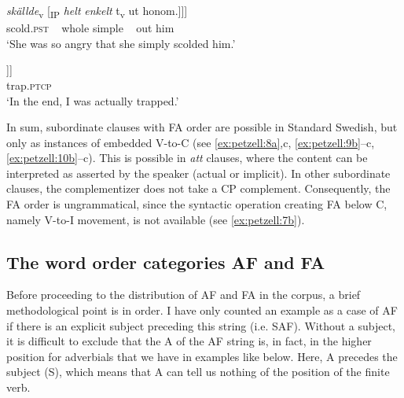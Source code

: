 \documentclass[output=paper,colorlinks,citecolor=brown,draft,draftmode]{langscibook}
\begin{document}
\gll     \textit{{skällde}}\textsubscript{v} [\textsubscript{IP} \textit{{helt}} \textit{{enkelt}} t\textsubscript{v}  ut    honom.]]]  \\
    scold.\textsc{pst} ~ whole simple ~  out  him\\
\glt `She was so angry that she simply scolded him.’  \\


\gll     [\textsubscript{CP}    att [\textsubscript{CP}  jag  \textit{{blev}}\textsubscript{v} [\textsubscript{IP}      \textit{{faktiskt}}  t\textsubscript{v}     \\
          ~ that   ~ I    become.\textsc{pst}   ~ actually ~ \\
\gll     instängd.]]]  \\
    trap.\textsc{ptcp}\\
\glt `In the end, I was actually trapped.’
\z
\z


In sum, subordinate clauses with FA order are possible in Standard Swedish, but only as instances of embedded V-to-C (see \ref{ex:petzell:8a},c, \ref{ex:petzell:9b}–c, \ref{ex:petzell:10b}–c). This is possible in \textit{att} clauses, where the content can be interpreted as asserted by the speaker (actual or implicit). In other subordinate clauses, the complementizer does not take a CP complement. Consequently, the FA order is ungrammatical, since the syntactic operation creating FA below C, namely V-to-I movement, is not available (see \ref{ex:petzell:7b}).


\subsection{The word order categories AF and FA}\label{sec:petzell:2.3}


Before proceeding to the distribution of AF and FA in the corpus, a brief methodological point is in order. I have only counted an example as a case of AF if there is an explicit subject preceding this string (i.e. SAF). Without a subject, it is difficult to exclude that the A of the AF string is, in fact, in the higher position for adverbials that we have in examples like  below. Here, A precedes the subject (S), which means that A can tell us nothing of the position of the finite verb.
\end{document}
